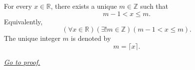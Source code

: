 \begin{lemma}
\label{lem:integer-ceiling-lemma}
For every $x\in\mathbb{R}$, there exists a unique $m\in\mathbb{Z}$ such that
\[
  m-1<x\leq m.
\]
Equivalently,
\[
  (\forall x\in\mathbb{R})(\exists!m\in\mathbb{Z})(m-1<x\leq m).
\]
The unique integer $m$ is denoted by
\[
  m=\lceil x\rceil.
\]

\smallskip
\noindent
\hyperref[prf:integer-ceiling-lemma]{\textit{Go to proof.}}
\end{lemma}
